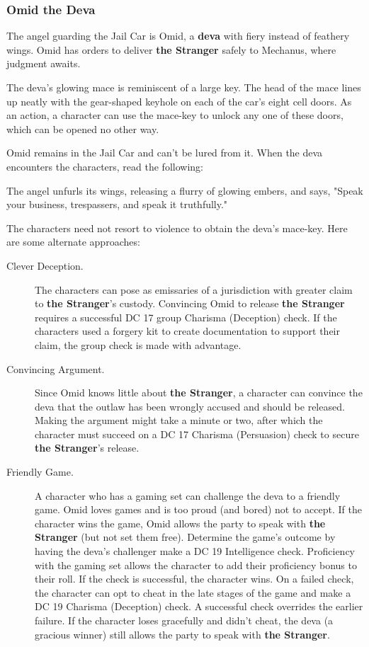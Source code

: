 \documentclass[10pt,a4paper,twoside,bg=print,twocolumn,openany,nodeprecatedcode]{dndarticle}
\begin{document}
\subsubsection{Omid the Deva}
The angel guarding the Jail Car is Omid, a \textbf{deva} with fiery instead of feathery wings. Omid has orders to deliver \textbf{the Stranger} safely to Mechanus, where judgment awaits.

The deva's glowing mace is reminiscent of a large key. The head of the mace lines up neatly with the gear-shaped keyhole on each of the car's eight cell doors. As an action, a character can use the mace-key to unlock any one of these doors, which can be opened no other way.

Omid remains in the Jail Car and can't be lured from it. When the deva encounters the characters, read the following:

\begin{DndReadAloud}{}
The angel unfurls its wings, releasing a flurry of glowing embers, and says, "Speak your business, trespassers, and speak it truthfully."

\end{DndReadAloud}

The characters need not resort to violence to obtain the deva's mace-key. Here are some alternate approaches:


\begin{description}
\item[Clever Deception.]
The characters can pose as emissaries of a jurisdiction with greater claim to \textbf{the Stranger}'s custody. Convincing Omid to release \textbf{the Stranger} requires a successful DC 17 group Charisma (Deception) check. If the characters used a forgery kit to create documentation to support their claim, the group check is made with advantage.
\item[Convincing Argument.]
Since Omid knows little about \textbf{the Stranger}, a character can convince the deva that the outlaw has been wrongly accused and should be released. Making the argument might take a minute or two, after which the character must succeed on a DC 17 Charisma (Persuasion) check to secure \textbf{the Stranger}'s release.
\item[Friendly Game.]
A character who has a gaming set can challenge the deva to a friendly game. Omid loves games and is too proud (and bored) not to accept. If the character wins the game, Omid allows the party to speak with \textbf{the Stranger} (but not set them free). Determine the game's outcome by having the deva's challenger make a DC 19 Intelligence check. Proficiency with the gaming set allows the character to add their proficiency bonus to their roll. If the check is successful, the character wins. On a failed check, the character can opt to cheat in the late stages of the game and make a DC 19 Charisma (Deception) check. A successful check overrides the earlier failure. If the character loses gracefully and didn't cheat, the deva (a gracious winner) still allows the party to speak with \textbf{the Stranger}.
\end{description}
\end{document}
